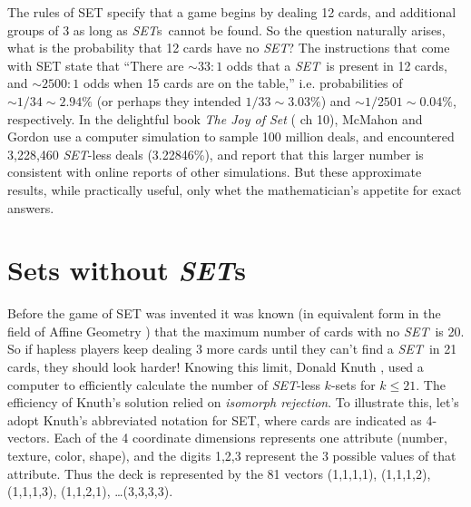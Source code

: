\documentclass{article}
\theoremstyle{theorem}
\theoremstyle{definition}
\newcommand{\SET}{{\em SET}}
\newcommand{\SETs}{{\em SET}s}
\begin{document}
The rules of SET specify that a game begins by dealing 12 cards, and additional
groups of 3 as long as \SETs~cannot be found. So the question naturally arises,
what is the probability that 12 cards have no \SET?  The instructions that come
with SET \cite{SET} state that ``There are $\sim 33:1$ odds that a \SET~is
present in 12 cards, and \mbox{$\sim 2500:1$} odds when 15 cards are on the
table,'' i.e. probabilities of $\sim 1/34\sim 2.94\%$ (or perhaps they intended
$1/33\sim 3.03\%$) and $\sim 1/2501\sim 0.04\%$, respectively. In the delightful
book {\em The Joy of Set} (\cite{JOS} ch 10), McMahon and Gordon use a computer
simulation to sample 100 million deals, and encountered 3,228,460 \SET-less
deals (3.22846\%), and report that this larger number is consistent with online
reports of other simulations. But these approximate results, while practically
useful, only whet the mathematician's appetite for exact answers.

\section{Sets without \SETs}
Before the game of SET was invented it was known (in equivalent form in the
field of Affine Geometry \cite{MAXCAP}) that the maximum number of cards with no
\SET~is 20. So if hapless players keep dealing 3 more cards until they can't
find a \SET~in 21 cards, they should look harder!  Knowing this limit, Donald
Knuth \cite{SETSET}, \cite{SETSET-ALL} used a computer to efficiently calculate
the number of \SET-less $k$-sets for $k\leq 21$. The efficiency of Knuth's
solution relied on {\em isomorph rejection}. To illustrate this, let's adopt
Knuth's abbreviated notation for SET, where cards are indicated as
4-vectors. Each of the 4 coordinate dimensions represents one attribute (number,
texture, color, shape), and the digits 1,2,3 represent the 3 possible values of
that attribute. Thus the deck is represented by the 81 vectors (1,1,1,1),
(1,1,1,2), (1,1,1,3), (1,1,2,1), \ldots (3,3,3,3).
\end{document}
